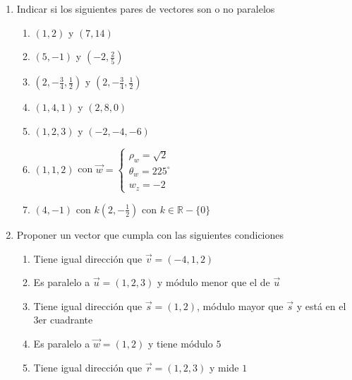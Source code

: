 \documentclass[a4paper]{article}
\newcommand{\exercise}{\item}
\newcommand{\SEL}[1]{ \left\{\begin{matrix} #1 \end{matrix}\right. }
\newcommand{\df}[2]{\displaystyle\frac{#1}{#2}}
\newcommand{\degs}{^{\circ}}
\begin{document}
\begin{enumerate}
\begin{enumerate} [label=(\alph*)]
		\item $2(t,t+1,0) - 3(t,5,1)$ ~con $t\in\mathbb{R}$
		\item $m(0,0,1)$ ~con $m\in\mathbb{R}$
		\item $a(1,0,0) + b (0,1,0)$ ~con $a,b \in \mathbb{R}$
		\item $\df{1}{|\vec{v}|}~ \vec{v}$ ~con $\vec{v}=(3,-4)$
		\item $5\vec{v} +7 \vec{w}$ ~con $\vec{v}=\SEL{ \rho_v = 4 \\ \theta_v = 45\degs\\ v_z = 1 }$ ~~y~~ $\vec{w}=\SEL{ \rho_w = 10 \\ \theta_w = 210\degs\\ w_z = -1 }$
	\end{enumerate}
	\exercise Indicar si los siguientes pares de vectores son o no paralelos 
	\begin{multicols}{2}
	\begin{enumerate} [label=(\alph*)]
		\item $(1,2)$ y $(7,14)$
		\item $(5,-1)$ y $\left(-2,\df{2}{5}\right)$
		\item $\left(2,-\df{3}{4},\df{1}{2}\right)$ y $\left(2,-\df{3}{4},\df{1}{2}\right)$
		\item $\left(1,4,1\right)$ y $\left(2,8,0\right)$
		\item $\left(1,2,3\right)$ y $\left(-2,-4,-6\right)$
		\item $(1,1,2)$ con $\vec{w}=\SEL{ \rho_w = \sqrt{2} \\ \theta_w = 225\degs\\ w_z = -2 }$
		\item $(4,-1)$ con $k\left(2,-\df{1}{2}\right)$ con $k\in\mathbb{R}-\{0\}$
	\end{enumerate}
	\end{multicols}
	\exercise Proponer un vector que cumpla con las siguientes condiciones
	\begin{enumerate} [label=(\alph*)]
		\item Tiene igual dirección que $\vec{v}=(-4,1,2)$
		\item Es paralelo a $\vec{u}=(1,2,3)$ y módulo menor que el de $\vec{u}$
		\item Tiene igual dirección que $\vec{s}=(1,2)$, módulo mayor que $\vec{s}$ y está en el 3er cuadrante
		\item Es paralelo a $\vec{w}=(1,2)$ y tiene módulo $5$
		\item Tiene igual dirección que $\vec{r}=(1,2,3)$ y mide $1$

\end{enumerate}
\end{enumerate}
\end{document}
